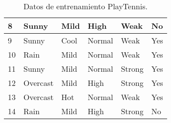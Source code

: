 \documentclass[12pt]{exam}
\begin{document}
\begin{questions}
\begin{table}[]
\begin{tabular}{|l|l|l|l|l|l|}
8                                  & Sunny                                 & Mild                                      & High                                   & Weak                               & No                                       \\ \hline
9                                  & Sunny                                 & Cool                                      & Normal                                 & Weak                               & Yes                                      \\ \hline
10                                 & Rain                                  & Mild                                      & Normal                                 & Weak                               & Yes                                      \\ \hline
11                                 & Sunny                                 & Mild                                      & Normal                                 & Strong                             & Yes                                      \\ \hline
12                                 & Overcast                              & Mild                                      & High                                   & Strong                             & Yes                                      \\ \hline
13                                 & Overcast                              & Hot                                       & Normal                                 & Weak                               & Yes                                      \\ \hline
14                                 & Rain                                  & Mild                                      & High                                   & Strong                             & No                                       \\ \hline
\end{tabular}
\caption{Datos de entrenamiento PlayTennis.}
\end{table}
\addpoints


\end{questions}
\end{document}
